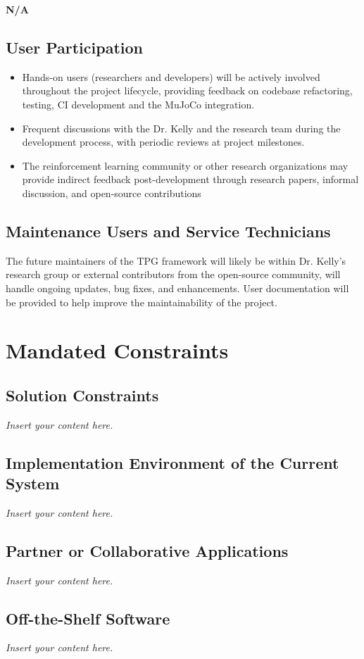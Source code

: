 \documentclass[12pt]{article}
\newcommand{\lips}{\textit{Insert your content here.}}
\begin{document}
\textbf{N/A}

\subsection{User Participation}
\begin{itemize}
  \item Hands-on users (researchers and developers) will be actively involved throughout the project lifecycle, providing feedback on codebase refactoring, testing, CI development and the MuJoCo integration.


  \item Frequent discussions with the Dr. Kelly and the research team during the development process, with periodic reviews at project milestones.

  \item The reinforcement learning community or other research organizations may provide indirect feedback post-development through research papers, informal discussion, and open-source contributions


  \end{itemize}
\subsection{Maintenance Users and Service Technicians}
The future maintainers of the TPG framework will likely be within Dr. Kelly’s research group or external contributors from the open-source community, will handle ongoing updates, bug fixes, and enhancements. User documentation will be provided to help improve the maintainability of the project.


\section{Mandated Constraints}
\subsection{Solution Constraints}
\lips
\subsection{Implementation Environment of the Current System}
\lips
\subsection{Partner or Collaborative Applications}
\lips
\subsection{Off-the-Shelf Software}
\lips
\end{document}
